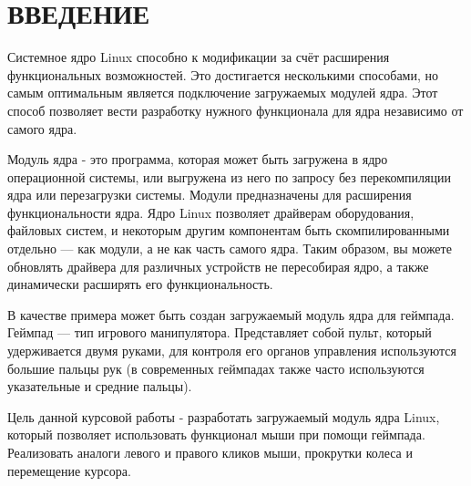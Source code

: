 \section*{ВВЕДЕНИЕ}
	Системное ядро Linux способно к модификации за счёт расширения функциональных возможностей. Это достигается несколькими способами, но самым оптимальным является подключение загружаемых модулей ядра. Этот способ позволяет вести разработку нужного функционала для ядра независимо от самого ядра.\par
	Модуль ядра - это программа, которая может быть загружена в ядро операционной системы, или выгружена из него по запросу без перекомпиляции ядра или перезагрузки системы. Модули предназначены для расширения функциональности ядра. Ядро Linux позволяет драйверам оборудования, файловых систем, и некоторым другим компонентам быть скомпилированными отдельно --- как модули, а не как часть самого ядра. Таким образом, вы можете обновлять драйвера для различных устройств не пересобирая ядро, а также динамически расширять его функциональность.\par
	В качестве примера может быть создан загружаемый модуль ядра для геймпада. 
	Геймпад — тип игрового манипулятора. Представляет собой пульт, который удерживается двумя руками, для контроля его органов управления используются большие пальцы рук (в современных геймпадах также часто используются указательные и средние пальцы).\par
	Цель данной курсовой работы - разработать загружаемый модуль ядра Linux, который позволяет использовать функционал мыши при помощи геймпада. Реализовать аналоги левого и правого кликов мыши, прокрутки колеса и перемещение курсора.\par
	
	
	
\pagebreak